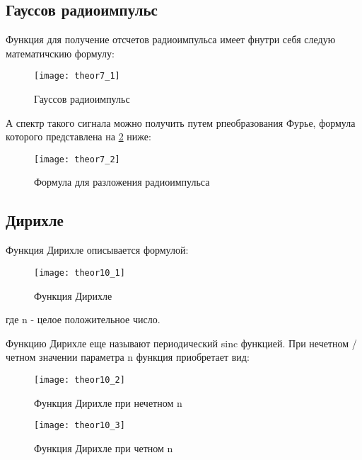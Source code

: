 \subsection{Гауссов радиоимпульс}
Функция для получение отсчетов радиоимпульса имеет фнутри себя следую математичскию формулу:
\begin{figure}[H]
	\begin{center}
		\texttt{[image: theor7\_1]}
		\caption{Гауссов радиоимпульс} 
		\label{pic:theor7_1} %
	\end{center}
\end{figure}
А спектр такого сигнала можно получить путем рпеобразования Фурье, формула которого представлена на \ref{pic:theor7_2} ниже:
\begin{figure}[H]
	\begin{center}
		\texttt{[image: theor7\_2]}
		\caption{Формула для разложения радиоимпульса} 
		\label{pic:theor7_2} %
	\end{center}
\end{figure}

\subsection{Дирихле}
Функция Дирихле описывается формулой:
\begin{figure}[H]
	\begin{center}
		\texttt{[image: theor10\_1]}
		\caption{Функция Дирихле} 
		\label{pic:theor10_1} %
	\end{center}
\end{figure}
где n - целое положительное число.

Функцию Дирихле еще называют периодический sinc функцией.
При нечетном / четном значении параметра n функция приобретает вид:
\begin{figure}[H]
	\begin{center}
		\texttt{[image: theor10\_2]}
		\caption{Функция Дирихле при нечетном n} 
		\label{pic:theor10_2} %
	\end{center}
\end{figure}
\begin{figure}[H]
	\begin{center}
		\texttt{[image: theor10\_3]}
		\caption{Функция Дирихле при четном n} 
		\label{pic:theor10_3} %
	\end{center}
\end{figure}

